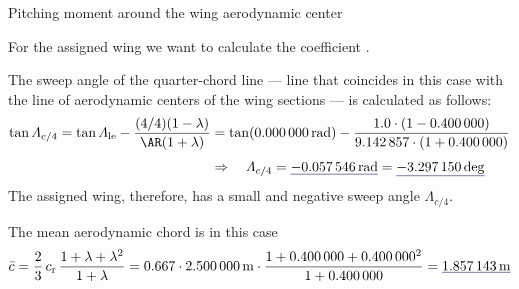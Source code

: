 \documentclass[[12pt,twoside]{book}
\begin{document}
\begin{myExampleX}{Pitching moment around the wing aerodynamic center}{}
\smallskip
\noindent
{}

\smallskip
\noindent
{}

\smallskip
\noindent
{}

\smallskip
For the assigned wing we want to calculate the coefficient .

\medskip
The sweep angle of the quarter-chord line --- line that coincides in this case with the line of aerodynamic centers of the wing sections --- is calculated as follows:
\[
\begin{split}
\tan
\Lambda_{c/4}
   = \tan\Lambda_\mathrm{le}-\dfrac{(4/4)(1-\lambda)}{\AR(1+\lambda)}
   & {}=
    \tan (\SI[round-precision=0]{\mySweepLEWingRAD}{\radian})
      - \dfrac{
         \num[round-precision=2]{1.0}
         \cdot (1-\SI[round-precision=2]{\myTaperRatioWing}{})
      }{
         \num[round-precision=2]{\myAspectRatioWing}
         \cdot (1+\SI[round-precision=2]{\myTaperRatioWing}{})} 
\\[3pt]
   & \Rightarrow
   \quad
   \Lambda_{c/4}
      = \mathunderline{mydarkblue}{ \SI[round-precision=4]{\mySweepQuarterChordWingRAD}{\radian} }
      = \mathunderline{mydarkblue}{ \SI[round-precision=1]{\mySweepQuarterChordWingDEG}{\deg} }
\end{split}
\]
The assigned wing, therefore, has a small and negative sweep angle $\Lambda_{c/4}$.

The mean aerodynamic chord is in this case
\[
\bar{c} = \frac{2}{3} \, c_\mathrm{r} \, \frac{1+\lambda + \lambda^2}{1+\lambda}
  =
    \num{0.667} \cdot \SI[round-precision=2]{\myChordRootWingMT}{\metre}
      \cdot 
        \frac{
          1 + \SI[round-precision=2]{\myTaperRatioWing}{} + \SI[round-precision=2]{\myTaperRatioWing}{}^2
        }{
          1 + \SI[round-precision=2]{\myTaperRatioWing}{}
        }
    = \mathunderline{mydarkblue}{ \SI[round-precision=2]{\myMACWingMT}{\metre} }
\]


\end{myExampleX}
\end{document}
